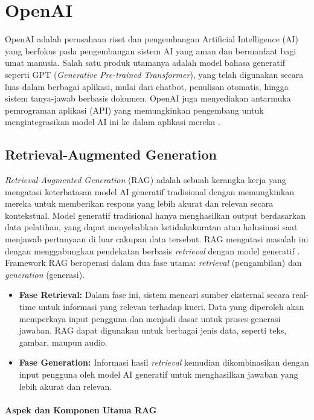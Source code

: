 \section{OpenAI}
OpenAI adalah perusahaan riset dan pengembangan Artificial Intelligence (AI) yang berfokus pada pengembangan sistem AI yang aman dan bermanfaat bagi umat manusia. Salah satu produk utamanya adalah model bahasa generatif seperti GPT (\textit{Generative Pre-trained Transformer}), yang telah digunakan secara luas dalam berbagai aplikasi, mulai dari chatbot, penulisan otomatis, hingga sistem tanya-jawab berbasis dokumen. OpenAI juga menyediakan antarmuka pemrograman aplikasi (API) yang memungkinkan pengembang untuk mengintegrasikan model AI ini ke dalam aplikasi mereka \citep{openai2025api}.

\subsection{Retrieval-Augmented Generation}
\textit{Retrieval-Augmented Generation} (RAG) adalah sebuah kerangka kerja yang mengatasi keterbatasan model AI generatif tradisional dengan memungkinkan mereka untuk memberikan respons yang lebih akurat dan relevan secara kontekstual. Model generatif tradisional hanya menghasilkan output berdasarkan data pelatihan, yang dapat menyebabkan ketidakakuratan atau halusinasi saat menjawab pertanyaan di luar cakupan data tersebut. RAG mengatasi masalah ini dengan menggabungkan pendekatan berbasis \textit{retrieval} dengan model generatif \citep{rothman2024rag}.
\singlespacing{}
Framework RAG beroperasi dalam dua fase utama: \textit{retrieval} (pengambilan) dan \textit{generation} (generasi).

\begin{itemize}
    \item \textbf{Fase Retrieval:} Dalam fase ini, sistem mencari sumber eksternal secara real-time untuk informasi yang relevan terhadap kueri. Data yang diperoleh akan memperkaya input pengguna dan menjadi dasar untuk proses generasi jawaban. RAG dapat digunakan untuk berbagai jenis data, seperti teks, gambar, maupun audio.
    \item \textbf{Fase Generation:} Informasi hasil \textit{retrieval} kemudian dikombinasikan dengan input pengguna oleh model AI generatif untuk menghasilkan jawaban yang lebih akurat dan relevan.
\end{itemize}

\paragraph{Aspek dan Komponen Utama RAG}

